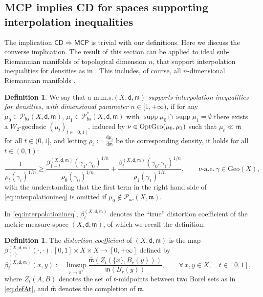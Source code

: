 \documentclass[11pt,a4paper]{article}
\theoremstyle{plain}
\theoremstyle{definition}
\newtheorem{definition}[theorem]{Definition}
\theoremstyle{remark}
\numberwithin{equation}{section}
\DeclareMathOperator{\supp}{\mathrm{supp}}
\newcommand{\CD}{\mathsf{CD}}
\newcommand{\Geo}{\mathrm{Geo}}
\newcommand{\MCP}{\mathsf{MCP}}
\newcommand{\OptGeo}{{\rm OptGeo}}
\newcommand{\Prob}{\mathcal{P}}
\newcommand{\di}{\mathrm{d}}
\newcommand{\mm}{\mathfrak m}
\newcommand{\sfd}{\mathsf d}
\begin{document}
\subsection{MCP implies CD for spaces supporting interpolation inequalities}\label{s:MCPtoCD}

The implication $\CD \Rightarrow\MCP$ is trivial with our definitions. Here we discuss the converse implication.  The result of this section can be applied to ideal sub-Riemannian manifolds of topological dimension $n$, that support interpolation inequalities for densities as in \cite{BRInv}. This includes, of course, all $n$-dimensional Riemannian manifolds \cite{CEMS}.

\begin{definition}\label{def:mcptocd}
We say that a m.m.s.\@ $(X,\sfd, \mm)$ \emph{supports interpolation inequalities for densities, with  dimensional parameter $n\in [1,+\infty)$}, if for any $\mu_0\in \Prob_{bs}(X,\sfd,\mm)$, $\mu_1 \in \Prob_{bs}^{*}(X,\sfd,\mm)$ with $\supp \mu_{0}\cap \supp \mu_{1}=\emptyset$ there exists a $W_2$-geodesic $(\mu_t)_{t\in [0,1]}$, induced by $\nu\in\OptGeo(\mu_0,\mu_1)$ such that $\mu_t\ll \mm$ for all $t\in (0,1]$, and letting $\rho_t:=\tfrac{\di \mu_t}{\di \mm}$ be the corresponding density, it holds for all $t\in (0,1)$:
\begin{equation}\label{eq:interpolationineq}
\frac{1}{\rho_t(\gamma_t)^{1/n}}\geq \frac{\beta_{1-t}^{(X,\sfd,\mm)}(\gamma_1,\gamma_0)^{1/n}}{\rho_0(\gamma_0)^{1/n}} + \frac{\beta_t^{(X,\sfd,\mm)}(\gamma_0,\gamma_1)^{1/n}}{\rho_1(\gamma_1)^{1/n}},\qquad \nu\text{-a.e.}\ \gamma \in \Geo(X),
\end{equation}
with the understanding that the first term in the right hand side of \eqref{eq:interpolationineq} is omitted if $\mu_0\notin \mathcal{P}_{ac}(X,\mm)$.  
\end{definition}

In \eqref{eq:interpolationineq}, $\beta_t^{(X,\sfd,\mm)}$ denotes the ``true'' distortion coefficient of the metric measure space $(X,\sfd,\mm)$, of which we recall the definition.
\begin{definition}\label{def:truedistcoeff}
The \emph{distortion coefficient} of $(X,\sfd,\mm)$ is the map $\beta_{(\cdot)}^{(X,\sfd,\mm)}(\cdot,\cdot): [0,1]\times X \times X \to [0,+\infty]$ defined by
\begin{equation}\label{eq:true}
\beta_t^{(X,\sfd,\mm)}(x,y):=\limsup_{r\to 0^+}\frac{\bar{\mm}(Z_t(\{x\},B_r(y)))}{\mm(B_r(y))}, \qquad \forall\, x,y\in X,\quad t\in [0,1],
\end{equation}
where $Z_t(A,B)$ denotes the set of $t$-midpoints between two Borel sets as in \eqref{eq:defAt}, and $\bar{\mm}$ denotes the completion of $\mm$.
\end{definition}
\end{document}
